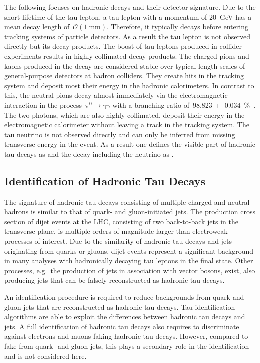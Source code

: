 The following focuses on hadronic decays and their detector signature. Due to
the short lifetime of the tau lepton, a tau lepton with a momentum of
\SI{20}{\GeV} has a mean decay length of~$\mathcal{O}(\SI{1}{\milli\metre})$.
Therefore, it typically decays before entering tracking systems of particle
detectors. As a result the tau lepton is not observed directly but its decay
products. The boost of tau leptons produced in collider experiments results in
highly collimated decay products. The charged pions and kaons produced in the
decay are considered stable over typical length scales of general-purpose
detectors at hadron colliders. They create hits in the tracking system and
deposit most their energy in the hadronic calorimeters. In contrast to this, the
neutral pions decay almost immediately via the electromagnetic interaction in
the process~\mbox{$\pi^0 \to \gamma\gamma$} with a branching ratio of~\SI{98.823
  +- 0.034}{\percent}~\cite{pdg}. The two photons, which are also highly
collimated, deposit their energy in the electromagnetic calorimeter without
leaving a track in the tracking system. The tau neutrino is not observed
directly and can only be inferred from missing transverse energy in the event.
As a result one defines the visible part of hadronic tau decays as \tauhadvis
and the decay including the neutrino as \tauhad.

\subsection{Identification of Hadronic Tau Decays}
\label{sec:features_tau_decay}

The signature of hadronic tau decays consisting of multiple charged and neutral
hadrons is similar to that of quark- and gluon-initiated jets. The production
cross section of dijet events at the LHC, consisting of two back-to-back jets in
the transverse plane, is multiple orders of magnitude larger than electroweak
processes of interest. Due to the similarity of hadronic tau decays and jets
originating from quarks or gluons, dijet events represent a significant
background in many analyses with hadronically decaying tau leptons in the final
state. Other processes, e.g.\ the production of jets in association with vector
bosons, exist, also producing jets that can be falsely reconstructed as hadronic
tau decays.

An identification procedure is required to reduce backgrounds from quark and
gluon jets that are reconstructed as hadronic tau decays. Tau identification
algorithms are able to exploit the differences between hadronic tau decays and
jets. A full identification of hadronic tau decays also requires to discriminate
against electrons and muons faking hadronic tau decays. However, compared to
fake \tauhad from quark- and gluon-jets, this plays a secondary role in the
identification and is not considered here.

